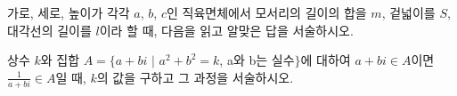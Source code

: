 \documentclass[11pt]{exam}
\begin{document}
\begin{questions}
\addpoints
\question[10] 가로, 세로, 높이가 각각 $a$, $b$, $c$인 직육면체에서 모서리의 길이의 합을 $m$, 겉넓이를 $S$, 대각선의 길이를 $l$이라 할 때, 다음을 읽고 알맞은 답을 서술하시오.
\noaddpoints

	
\addpoints
\question[8] 상수 $k$와 집합 $A=\{a+bi$ $\vert$ $a^2+b^2=k$, a와 b는 실수$\}$에  대하여 $a+bi \in A$이면 $\frac{1}{a+bi} \in A$일 때, $k$의 값을 구하고 그 과정을 서술하시오.
\end{questions}
\end{document}
